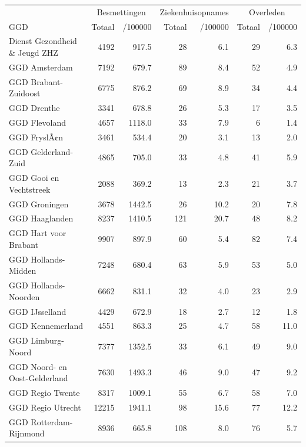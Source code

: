 \documentclass[
  english,
  man,floatsintext]{apa6}
\begin{document}
\begin{table}[H]
\centering\begingroup\fontsize{10}{12}\selectfont

\begin{threeparttable}
\begin{tabular}{lrrrrrr}
\toprule
\multicolumn{1}{c}{ } & \multicolumn{2}{c}{Besmettingen} & \multicolumn{2}{c}{Ziekenhuisopnames} & \multicolumn{2}{c}{Overleden} \\
\cmidrule(l{3pt}r{3pt}){2-3} \cmidrule(l{3pt}r{3pt}){4-5} \cmidrule(l{3pt}r{3pt}){6-7}
GGD & Totaal & /100000 & Totaal & /100000 & Totaal & /100000\\
\midrule
Dienst Gezondheid \& Jeugd ZHZ & 4192 & 917.5 & 28 & 6.1 & 29 & 6.3\\
GGD Amsterdam & 7192 & 679.7 & 89 & 8.4 & 52 & 4.9\\
GGD Brabant-Zuidoost & 6775 & 876.2 & 69 & 8.9 & 34 & 4.4\\
GGD Drenthe & 3341 & 678.8 & 26 & 5.3 & 17 & 3.5\\
GGD Flevoland & 4657 & 1118.0 & 33 & 7.9 & 6 & 1.4\\
GGD FryslÃ¢n & 3461 & 534.4 & 20 & 3.1 & 13 & 2.0\\
GGD Gelderland-Zuid & 4865 & 705.0 & 33 & 4.8 & 41 & 5.9\\
GGD Gooi en Vechtstreek & 2088 & 369.2 & 13 & 2.3 & 21 & 3.7\\
GGD Groningen & 3678 & 1442.5 & 26 & 10.2 & 20 & 7.8\\
GGD Haaglanden & 8237 & 1410.5 & 121 & 20.7 & 48 & 8.2\\
GGD Hart voor Brabant & 9907 & 897.9 & 60 & 5.4 & 82 & 7.4\\
GGD Hollands-Midden & 7248 & 680.4 & 63 & 5.9 & 53 & 5.0\\
GGD Hollands-Noorden & 6662 & 831.1 & 32 & 4.0 & 23 & 2.9\\
GGD IJsselland & 4429 & 672.9 & 18 & 2.7 & 12 & 1.8\\
GGD Kennemerland & 4551 & 863.3 & 25 & 4.7 & 58 & 11.0\\
GGD Limburg-Noord & 7377 & 1352.5 & 33 & 6.1 & 49 & 9.0\\
GGD Noord- en Oost-Gelderland & 7630 & 1493.3 & 46 & 9.0 & 47 & 9.2\\
GGD Regio Twente & 8317 & 1009.1 & 55 & 6.7 & 58 & 7.0\\
GGD Regio Utrecht & 12215 & 1941.1 & 98 & 15.6 & 77 & 12.2\\
GGD Rotterdam-Rijnmond & 8936 & 665.8 & 108 & 8.0 & 76 & 5.7\\

\end{tabular}
\end{threeparttable}
\end{table}
\end{document}
